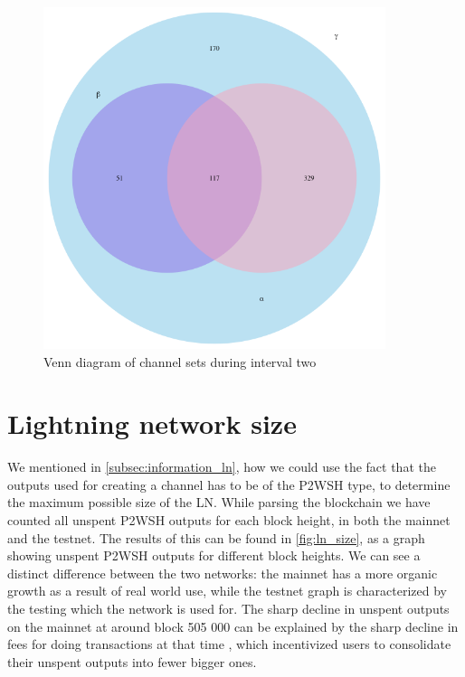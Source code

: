 \begin{figure}[ht]
    \centering
    \includegraphics[width=10cm]{figures/graphs/venn_run2.png}
    \caption{Venn diagram of channel sets during interval two}
    \label{fig:venn_run2}
\end{figure}

\section{Lightning network size}

We mentioned in \cref{subsec:information_ln}, how we could use the fact that the outputs used for creating a channel has to be of the P2WSH type, to determine the maximum possible size of the LN.
While parsing the blockchain we have counted all unspent P2WSH outputs for each block height, in both the mainnet and the testnet.
The results of this can be found in \cref{fig:ln_size}, as a graph showing unspent P2WSH outputs for different block heights.
We can see a distinct difference between the two networks: the mainnet has a more organic growth as a result of real world use, while the testnet graph is characterized by the testing which the network is used for. The sharp decline in unspent outputs on the mainnet at around block 505 000 can be explained by the sharp decline in fees for doing transactions at that time \cite{mempool_stats}, which incentivized users to consolidate their unspent outputs into fewer bigger ones. 

